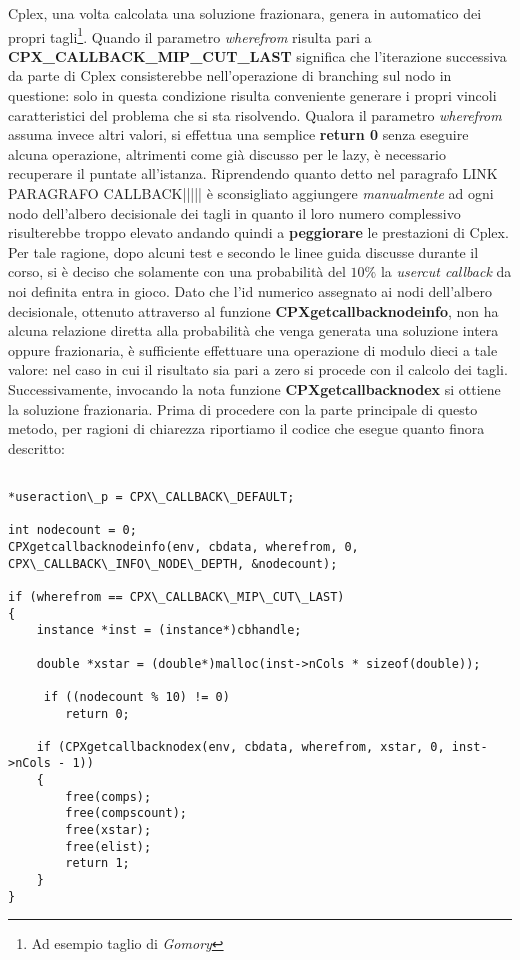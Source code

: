 \documentclass[11pt]{article}
\begin{document}
Cplex, una volta calcolata una soluzione frazionara, genera in automatico dei propri tagli\footnote{Ad esempio taglio di \textit{Gomory}}. Quando il parametro \textit{wherefrom} risulta pari a \textbf{CPX\_CALLBACK\_MIP\_CUT\_LAST} significa che l'iterazione successiva da parte di Cplex consisterebbe nell'operazione di branching sul nodo in questione: solo in questa condizione risulta conveniente generare i propri vincoli caratteristici del problema che si sta risolvendo. Qualora il parametro \textit{wherefrom} assuma invece altri valori, si effettua una semplice \textbf{return 0} senza eseguire alcuna operazione, altrimenti come già discusso per le lazy, è necessario recuperare il puntate all’istanza.
Riprendendo quanto detto nel paragrafo LINK PARAGRAFO CALLBACK||||| è sconsigliato aggiungere \textit{manualmente} ad ogni nodo dell’albero decisionale dei tagli in quanto il loro numero complessivo risulterebbe troppo elevato andando quindi a \textbf{peggiorare} le prestazioni di Cplex. Per tale ragione, dopo alcuni test e secondo le linee guida discusse durante il corso, si è deciso che solamente con una probabilità del \textbf{$10\%$} la \textit{usercut callback} da noi definita entra in gioco. Dato che l'id numerico assegnato ai nodi dell'albero decisionale, ottenuto attraverso al funzione \textbf{CPXgetcallbacknodeinfo}, non ha alcuna relazione diretta alla probabilità che venga generata una soluzione intera oppure frazionaria, è sufficiente effettuare una operazione di modulo dieci a tale valore: nel caso in cui il risultato sia pari a zero si procede con il calcolo dei tagli. Successivamente, invocando la nota funzione \textbf{CPXgetcallbacknodex} si ottiene la soluzione frazionaria. Prima di procedere con la parte principale di questo metodo, per ragioni di chiarezza riportiamo il codice che esegue quanto finora descritto:


\begin{lstlisting}

*useraction\_p = CPX\_CALLBACK\_DEFAULT;
    
int nodecount = 0;
CPXgetcallbacknodeinfo(env, cbdata, wherefrom, 0, CPX\_CALLBACK\_INFO\_NODE\_DEPTH, &nodecount);
    
if (wherefrom == CPX\_CALLBACK\_MIP\_CUT\_LAST)
{
    instance *inst = (instance*)cbhandle;
        
    double *xstar = (double*)malloc(inst->nCols * sizeof(double));

     if ((nodecount % 10) != 0)
        return 0;

    if (CPXgetcallbacknodex(env, cbdata, wherefrom, xstar, 0, inst->nCols - 1))
    {
        free(comps);
        free(compscount);
        free(xstar);
        free(elist);
        return 1; 
    }
}

\end{lstlisting}
\end{document}
